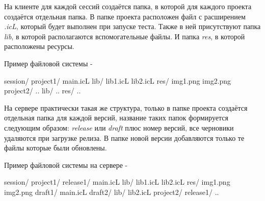 На клиенте для каждой сессий создаётся папка, в которой для каждого проекта создаётся отдельная папка. В папке проекта расположен файл с расширением {\it .icL}, который будет выполнен при запуске теста. Также в ней присутствуют папка {\it lib}, в которой располагаются вспомогательные файлы. И папка {\it res}, в которой расположены ресурсы.

Пример файловой системы -
\begin{jscode}
session/
	project1/
		main.icL
		lib/
			lib1.icL
			lib2.icL
		res/
			img1.png
			img2.png
		project2/
			..
			lib/
				..
			res/
				..
\end{jscode}

На сервере практически такая же структура, только в папке проекта создаётся отдельная папка для каждой версий, название таких папок формируется следующим образом: {\it release} или {\it draft} плюс номер версий, все черновики удаляются при загрузке релиза. В папке новой версии добавляются только те файлы которые были обновлены.

Пример файловой системы на сервере -

\begin{jscode}
session/
	project1/
		release1/
			main.icL
			lib/
				lib1.icL
				lib2.icL
			res/
				img1.png
				img2.png
		draft1/
			main.icL
		draft2/
			lib/
				lib2.icL
	project2/
		release1/
			..
\end{jscode}